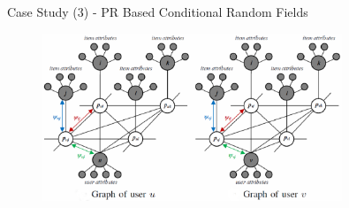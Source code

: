 \documentclass[
 size=14pt,
 paper=smartboard,  %
 mode=present, 		%
 display=slides, 	%
 style=tuliplab,  	%
 pauseslide,
 fleqn,leqno]{powerdot}{}
\begin{document}
\begin{slide}[toc=,bm=]{Case Study (3) - PR Based Conditional Random Fields}
	
	\begin{figure}[htbp]
		
		\includegraphics[width=0.8\textwidth]{figures//theme3//Theme3_5_3.eps}
		
	\end{figure}
	
	
	
\end{slide}

\end{document}
